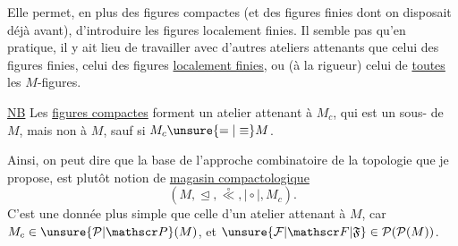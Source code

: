 Elle permet, en plus des  figures compactes (et des figures finies dont on disposait déjà avant), d'introduire les figures localement finies. Il  semble pas qu'en pratique, il y ait lieu de travailler avec d'autres ateliers attenants que celui des figures finies, celui des figures \uline{localement finies}, ou (à la rigueur) celui de \uline{toutes} les $M$-figures.

\uline{NB} Les \uline{figures compactes} forment un atelier attenant à $M_c$, qui est un sous-\uline{} de $M$, mais non à $M$, sauf si $M_c\unsure{=|\equiv}M$.

Ainsi, on peut dire que la base  de l'approche combinatoire de la topologie que je propose, est plutôt  notion de \uline{magasin compactologique}
\[
(M,\trianglelefteq,\overset{\circ}{\ll},\mathrel{\mid\circ\mid},M_c).
\]
C'est une donnée plus simple que celle d'un atelier attenant à $M$, car $M_c\in\unsure{\mathcal P|\mathscr P}(M)$, et $\unsure{\mathcal F|\mathscr F|\mathfrak F}\in\mathcal P(\mathcal P(M))$.
